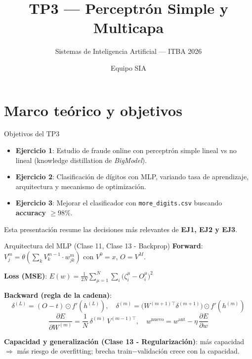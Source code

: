 \documentclass[aspectratio=169,10pt]{beamer}
\title{TP3 — Perceptrón Simple y Multicapa}
\subtitle{Sistemas de Inteligencia Artificial — ITBA 2026}
\author{Equipo SIA}
\date{}
\begin{document}
\maketitle

\section{Marco teórico y objetivos}

\begin{frame}{Objetivos del TP3}
  \begin{itemize}
    \item \textbf{Ejercicio 1}: Estudio de fraude online con perceptrón simple
      lineal vs no lineal (knowledge distillation de \emph{BigModel}).
    \item \textbf{Ejercicio 2}: Clasificación de dígitos con MLP, variando
      tasa de aprendizaje, arquitectura y mecanismo de optimización.
    \item \textbf{Ejercicio 3}: Mejorar el clasificador con
      \texttt{more\_digits.csv} buscando \textbf{accuracy $\geq 98\%$}.
  \end{itemize}
  \vspace{0.5em}
  Esta presentación resume las decisiones más relevantes de \textbf{EJ1, EJ2 y EJ3}.
\end{frame}

\begin{frame}{Arquitectura del MLP (Clase 11, Clase 13 - Backprop)}
  \textbf{Forward}: $V_j^m = \theta\!\left(\sum_k V_k^{m-1} \cdot w_{jk}^m\right)$
  con $V^0 = x$, $O = V^M$.

  \textbf{Loss (MSE)}: $E(w) = \frac{1}{2N} \sum_{\mu=1}^N \sum_i \big(\zeta_i^\mu - O_i^\mu\big)^2$

  \textbf{Backward (regla de la cadena)}:
  \[
    \delta^{(L)} = (O - t) \odot f'(h^{(L)}), \quad
    \delta^{(m)} = \big(W^{(m+1)\top}\delta^{(m+1)}\big) \odot f'(h^{(m)})
  \]
  \[
    \frac{\partial E}{\partial W^{(m)}} = \frac{1}{N}\,\delta^{(m)}\,V^{(m-1)\top}, \quad
    w^{\text{nuevo}} = w^{\text{ant}} - \eta\,\frac{\partial E}{\partial w}
  \]

  \textbf{Capacidad y generalización (Clase 13 - Regularización)}:
  más capacidad $\Rightarrow$ más riesgo de overfitting; brecha
  train$-$validación crece con la capacidad.
\end{frame}

\end{document}
